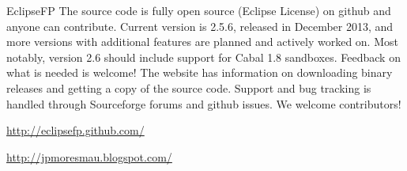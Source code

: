 \begin{hcarentry}[updated]{EclipseFP}
The source code is fully open source (Eclipse License) on github and anyone can contribute. Current version is 2.5.6, released in December 2013, and more versions with additional features are planned and actively worked on. Most notably, version 2.6 should include support for Cabal 1.8 sandboxes. Feedback on what is needed is welcome! The website has information on downloading binary releases and getting a copy of the source code. Support and bug tracking is handled through Sourceforge forums and github issues. We welcome contributors!

\FurtherReading
\begin{compactitem}
\item \url{http://eclipsefp.github.com/}
\item \url{http://jpmoresmau.blogspot.com/}
\end{compactitem}
\end{hcarentry}
